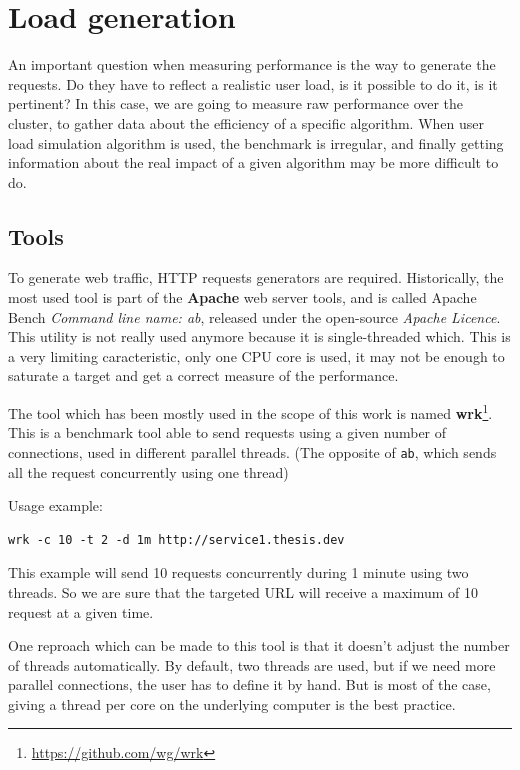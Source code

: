 \section{Load generation}

An important question when measuring performance is the way to generate the
requests. Do they have to reflect a realistic user load, is it possible to do
it, is it pertinent? In this case, we are going to measure raw performance
over the cluster, to gather data about the efficiency of a specific algorithm.
When user load simulation algorithm is used, the benchmark is irregular, and
finally getting information about the real impact of a given algorithm may be
more difficult to do.

\subsection{Tools}

To generate web traffic, HTTP requests generators are required. Historically,
the most used tool is part of the \textbf{Apache} web server tools, and is
called Apache Bench \textit{Command line name: ab}, released under the
open-source \textit{Apache Licence}. This utility is not really used anymore
because it is single-threaded which. This is a very limiting caracteristic,
only one CPU core is used, it may not be enough to saturate a target and get a
correct measure of the performance.

The tool which has been mostly used in the scope of this work is named
\textbf{wrk}\footnote{\url{https://github.com/wg/wrk}}. This is a benchmark
tool able to send requests using a given number of connections, used in
different parallel threads. (The opposite of \texttt{ab}, which sends all
the request concurrently using one thread)

Usage example:

\vspace{1em}
\begin{lstlisting}
wrk -c 10 -t 2 -d 1m http://service1.thesis.dev
\end{lstlisting}

This example will send 10 requests concurrently during 1 minute using two threads.
So we are sure that the targeted URL will receive a maximum of 10 request at a
given time.

One reproach which can be made to this tool is that it doesn't adjust the
number of threads automatically. By default, two threads are used, but if we
need more parallel connections, the user has to define it by hand. But is most
of the case, giving a thread per core on the underlying computer is the
best practice.

